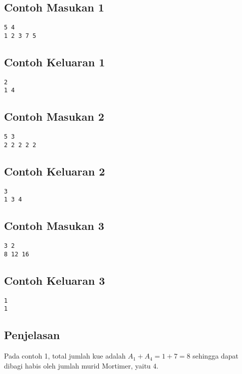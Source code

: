 \documentclass{article}
\begin{document}
\begin{multicols}{2}
\subsection*{Contoh Masukan 1}
\begin{lstlisting}
5 4
1 2 3 7 5
\end{lstlisting}
\columnbreak

\subsection*{Contoh Keluaran 1}
\begin{lstlisting}
2
1 4
\end{lstlisting}
\vfill
\null
\end{multicols}

\begin{multicols}{2}
\subsection*{Contoh Masukan 2}
\begin{lstlisting}
5 3
2 2 2 2 2
\end{lstlisting}
\columnbreak

\subsection*{Contoh Keluaran 2}
\begin{lstlisting}
3
1 3 4
\end{lstlisting}
\vfill
\null
\end{multicols}

\begin{multicols}{2}
\subsection*{Contoh Masukan 3}
\begin{lstlisting}
3 2
8 12 16
\end{lstlisting}
\columnbreak

\subsection*{Contoh Keluaran 3}
\begin{lstlisting}
1
1
\end{lstlisting}
\vfill
\null
\end{multicols}

\subsection*{Penjelasan}
Pada contoh 1, total jumlah kue adalah $A_1 + A_4 = 1 + 7 = 8$ sehingga dapat dibagi habis oleh jumlah murid Mortimer, yaitu $4$.
\end{document}
